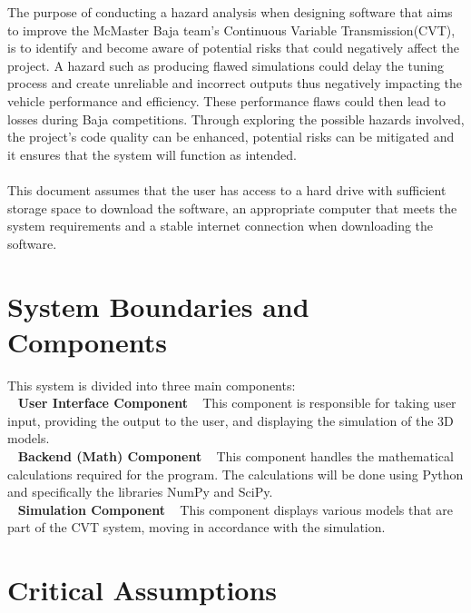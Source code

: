 \documentclass{article}
\begin{document}
The purpose of conducting a hazard analysis when designing software that aims to improve the
McMaster Baja team's Continuous Variable Transmission(CVT), is to identify and become aware of potential risks that could negatively affect the project. 
A hazard such as producing flawed simulations could delay the tuning process and create unreliable and incorrect outputs thus negatively impacting the vehicle performance and efficiency. 
These performance flaws could then lead to losses during Baja competitions. 
Through exploring the possible hazards involved, the project's code quality can be enhanced, potential risks can be mitigated and it ensures that the system will function as intended. 
\\\\
\noindent This document assumes that the user has access to a hard drive with sufficient storage space to download the software, an appropriate computer that meets the system requirements and a stable internet connection when downloading the software. 

\section{System Boundaries and Components}

This system is divided into three main components:\\
~\newline
\textbf{User Interface Component}  
~\newline
This component is responsible for taking user input, providing the output to the user, and displaying the simulation of the 3D models.\\
~\newline
\textbf{Backend (Math) Component}  
~\newline
This component handles the mathematical calculations required for the program. The calculations will be done using Python and specifically the libraries NumPy and SciPy.\\
~\newline
\textbf{Simulation Component}  
~\newline
This component displays various models that are part of the CVT system, moving in accordance with the simulation.\\

\section{Critical Assumptions}
\end{document}

